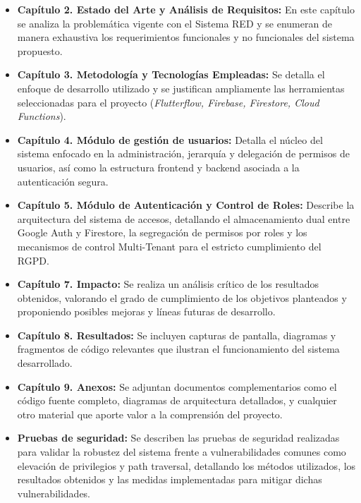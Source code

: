 \begin{itemize}
    \item \textbf{Capítulo 2. Estado del Arte y Análisis de Requisitos:} En este capítulo se analiza la problemática vigente con el Sistema RED y se enumeran de manera exhaustiva los requerimientos funcionales y no funcionales del sistema propuesto.
    \item \textbf{Capítulo 3. Metodología y Tecnologías Empleadas:} Se detalla el enfoque de desarrollo utilizado y se justifican ampliamente las herramientas seleccionadas para el proyecto (\textit{Flutterflow, Firebase, Firestore, Cloud Functions}).
    \item \textbf{Capítulo 4. Módulo de gestión de usuarios:} Detalla el núcleo del sistema enfocado en la administración, jerarquía y delegación de permisos de usuarios, así como la estructura frontend y backend asociada a la autenticación segura.   
    \item \textbf{Capítulo 5. Módulo de Autenticación y Control de Roles:} Describe la arquitectura del sistema de accesos, detallando el almacenamiento dual entre Google Auth y Firestore, la segregación de permisos por roles  y los mecanismos de control Multi-Tenant para el estricto cumplimiento del RGPD.
    \item \textbf{Capítulo 7. Impacto:} Se realiza un análisis crítico de los resultados obtenidos, valorando el grado de cumplimiento de los objetivos planteados y proponiendo posibles mejoras y líneas futuras de desarrollo.
    \item \textbf{Capítulo 8. Resultados:} Se incluyen capturas de pantalla, diagramas y fragmentos de código relevantes que ilustran el funcionamiento del sistema desarrollado.
    \item \textbf{Capítulo 9. Anexos: } Se adjuntan documentos complementarios como el código fuente completo, diagramas de arquitectura detallados, y cualquier otro material que aporte valor a la comprensión del proyecto.
    \item \textbf{Pruebas de seguridad:} Se describen las pruebas de seguridad realizadas para validar la robustez del sistema frente a vulnerabilidades comunes como elevación de privilegios y path traversal, detallando los métodos utilizados, los resultados obtenidos y las medidas implementadas para mitigar dichas vulnerabilidades.
\end{itemize}

